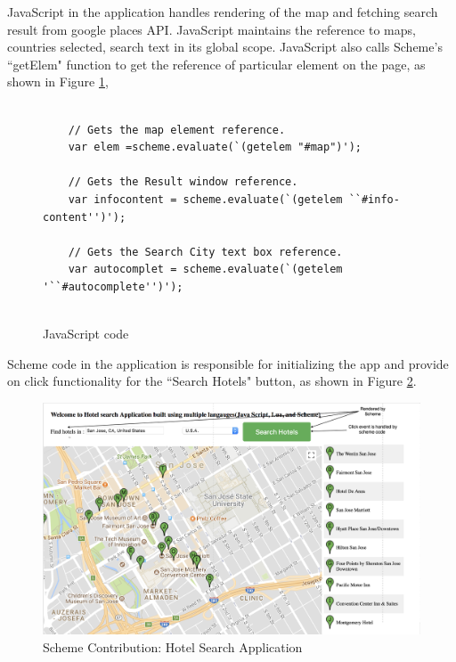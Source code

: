 JavaScript in the application handles rendering of the map and fetching search result from google places API. JavaScript maintains the reference to maps, countries selected, search text in its global scope. JavaScript also calls Scheme's ``getElem" function to get the reference of particular element on the page, as shown in Figure \ref{fig:js-code}, 

\begin{figure}[H]
	\begin{lstlisting}
	
	// Gets the map element reference.
	var elem =scheme.evaluate(`(getelem "#map")');
	
	// Gets the Result window reference.
	var infocontent = scheme.evaluate(`(getelem ``#info-content'')');
	
	// Gets the Search City text box reference.
	var autocomplet = scheme.evaluate(`(getelem '``#autocomplete'')');
	
	\end{lstlisting} 
	\caption{JavaScript code}
	\label{fig:js-code}
\end{figure}


Scheme code in the application is responsible for initializing the app and provide on click functionality for the ``Search Hotels" button, as shown in Figure \ref{fig:schemeINteraction}.

\begin{figure}[H]
	\begin{center}
		\includegraphics[width=\linewidth]{./images/schemeINteraction.png}
	\end{center}
	\caption{Scheme Contribution: Hotel Search Application}
	\label{fig:schemeINteraction}
\end{figure}

